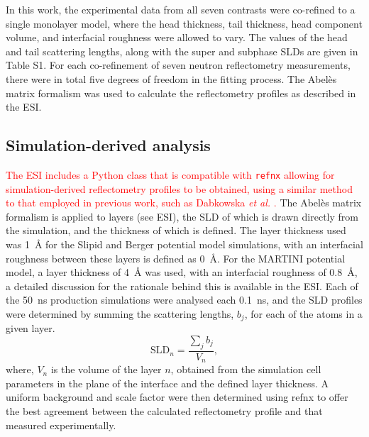 \documentclass[amsmath,amssymb,twocolumn,superscriptaddress]{revtex4-1}
\begin{document}
In this work, the experimental data from all seven contrasts were co-refined
to a single monolayer model, where the head thickness, tail thickness, head
component volume, and interfacial roughness were allowed to vary.
The values of the head and tail scattering lengths, along with the super and
subphase SLDs are given in Table S1.
For each co-refinement of seven neutron reflectometry measurements, there
were in total five degrees of freedom in the fitting process.
The Abel\`{e}s matrix formalism was used to calculate the reflectometry
profiles as described in the ESI.

\subsection{Simulation-derived analysis}
\textcolor{red}{The ESI includes a Python class that is compatible with
\texttt{refnx} \cite{nelson_refnx_2019,nelson_refnx_2018} allowing for
simulation-derived reflectometry profiles to be obtained, using a similar
method to that employed in previous work, such as
Dabkowska \emph{et al.} \cite{dabkowska_modulation_2014}.}
The Abel\`{e}s matrix formalism is applied to layers (see ESI), the SLD of
which is drawn directly from the simulation, and the thickness of which is
defined.
The layer thickness used was \SI{1}{\angstrom} for the Slipid and Berger
potential model simulations, with an interfacial roughness between these
layers is defined as \SI{0}{\angstrom}.
For the MARTINI potential model, a layer thickness of \SI{4}{\angstrom} was
used, with an interfacial roughness of \SI{0.8}{\angstrom}, a detailed
discussion for the rationale behind this is available in the ESI.
Each of the \SI{50}{\nano\second} production simulations were analysed each
\SI{0.1}{\nano\second}, and the SLD profiles were determined by summing the
scattering lengths, $b_j$, for each of the atoms in a given layer.
%
\begin{equation}
  \text{SLD}_n = \frac{\sum_j{b_j}}{V_n},
\end{equation}
%
where, $V_n$ is the volume of the layer $n$, obtained from the simulation
cell parameters in the plane of the interface and the defined layer thickness.
A uniform background and scale factor were then determined using refnx to
offer the best agreement between the calculated reflectometry profile and
that measured experimentally.
\end{document}
